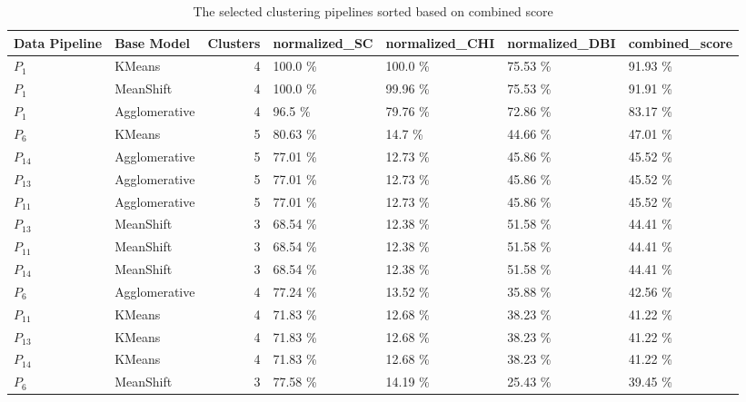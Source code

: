 \begin{table}[t]
\centering
\caption{The selected clustering pipelines sorted based on combined score}
\label{tbl:SP_PCA_Combined_Score_Results}
\begin{tabular}{llrllll}
\toprule
Data Pipeline &    Base Model &  Clusters & normalized_SC & normalized_CHI & normalized_DBI & combined_score \\
\midrule
      $P_{1}$ &        KMeans &         4 &      100.0 \% &       100.0 \% &       75.53 \% &       91.93 \% \\
      $P_{1}$ &     MeanShift &         4 &      100.0 \% &       99.96 \% &       75.53 \% &       91.91 \% \\
      $P_{1}$ & Agglomerative &         4 &       96.5 \% &       79.76 \% &       72.86 \% &       83.17 \% \\
      $P_{6}$ &        KMeans &         5 &      80.63 \% &        14.7 \% &       44.66 \% &       47.01 \% \\
     $P_{14}$ & Agglomerative &         5 &      77.01 \% &       12.73 \% &       45.86 \% &       45.52 \% \\
     $P_{13}$ & Agglomerative &         5 &      77.01 \% &       12.73 \% &       45.86 \% &       45.52 \% \\
     $P_{11}$ & Agglomerative &         5 &      77.01 \% &       12.73 \% &       45.86 \% &       45.52 \% \\
     $P_{13}$ &     MeanShift &         3 &      68.54 \% &       12.38 \% &       51.58 \% &       44.41 \% \\
     $P_{11}$ &     MeanShift &         3 &      68.54 \% &       12.38 \% &       51.58 \% &       44.41 \% \\
     $P_{14}$ &     MeanShift &         3 &      68.54 \% &       12.38 \% &       51.58 \% &       44.41 \% \\
      $P_{6}$ & Agglomerative &         4 &      77.24 \% &       13.52 \% &       35.88 \% &       42.56 \% \\
     $P_{11}$ &        KMeans &         4 &      71.83 \% &       12.68 \% &       38.23 \% &       41.22 \% \\
     $P_{13}$ &        KMeans &         4 &      71.83 \% &       12.68 \% &       38.23 \% &       41.22 \% \\
     $P_{14}$ &        KMeans &         4 &      71.83 \% &       12.68 \% &       38.23 \% &       41.22 \% \\
      $P_{6}$ &     MeanShift &         3 &      77.58 \% &       14.19 \% &       25.43 \% &       39.45 \% \\

\end{tabular}
\end{table}
